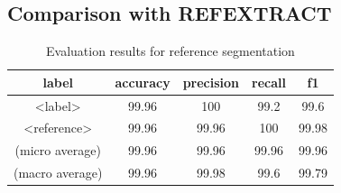 \subsection{Comparison with REFEXTRACT}
\label{subsec:refextract}
\begin{table}[h]
\begin{center}
\begin{tabular}{|c|cccc|}
\hline
label		&accuracy	&precision	&recall		&f1 \\
\hline
<label>		&99.96		&100		&99.2		&99.6\\
<reference>		&99.96		&99.96		&100		&99.98\\
\hline
(micro average) & 99.96		&99.96		&99.96		&99.96	\\
(macro average) &	99.96 & 99.98	& 99.6 & 99.79	\\
\hline
\end{tabular}
\caption[Table caption text]{Evaluation results for reference segmentation}
\end{center}
\end{table}

